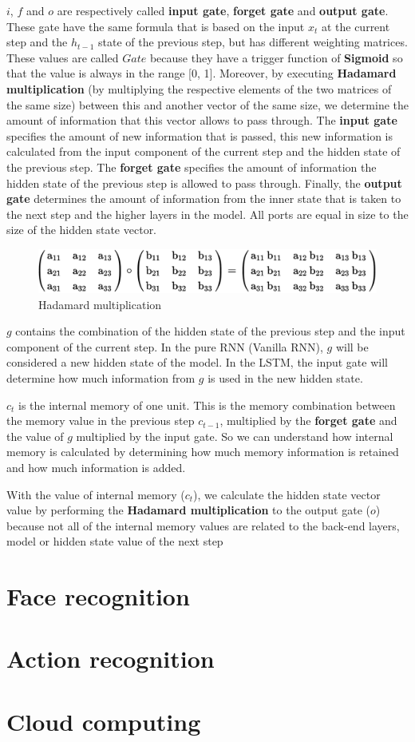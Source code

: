 $i$, $f$ and $o$ are respectively called \textbf{input gate}, \textbf{forget gate} and \textbf{output gate}. These gate have the same formula that is based on the input $x_{t}$ at the current step and the $h_{t-1}$ state of the previous step, but has different weighting matrices. These values are called $Gate$ because they have a trigger function of \textbf{Sigmoid} so that the value is always in the range [0, 1]. Moreover, by executing \textbf{Hadamard multiplication} (by multiplying the respective elements of the two matrices of the same size) between this and another vector of the same size, we determine the amount of information that this vector allows to pass through. The \textbf{input gate} specifies the amount of new information that is passed, this new information is calculated from the input component of the current step and the hidden state of the previous step. The \textbf{forget gate} specifies the amount of information the hidden state of the previous step is allowed to pass through. Finally, the \textbf{output gate} determines the amount of information from the inner state that is taken to the next step and the higher layers in the model. All ports are equal in size to the size of the hidden state vector.
\begin{center}
  \begin{figure}[H]
  \centering
  \includegraphics[width=0.8\columnwidth]{images/chap2/Hadamard.png}
  \caption{Hadamard multiplication}
  \label{chap2:WSP}
  \end{figure}
\end{center}
$g$ contains the combination of the hidden state of the previous step and the input component of the current step. In the pure RNN (Vanilla RNN), $g$ will be considered a new hidden state of the model. In the LSTM, the input gate will determine how much information from $g$ is used in the new hidden state.

$c_{t}$ is the internal memory of one unit. This is the memory combination between the memory value in the 
previous step $c_{t-1}$, multiplied by the \textbf{forget gate} and the value of $g$ multiplied by the input gate. So we can understand how internal memory is calculated by determining how much memory information is retained and how much information is added.

With the value of internal memory ($c_{t}$), we calculate the hidden state vector value by performing the \textbf{Hadamard multiplication} to the output gate ($o$) because not all of the internal memory values are related to the back-end layers, model or hidden state value of the next step



\section{Face recognition}
\section{Action recognition}
\section{Cloud computing}
